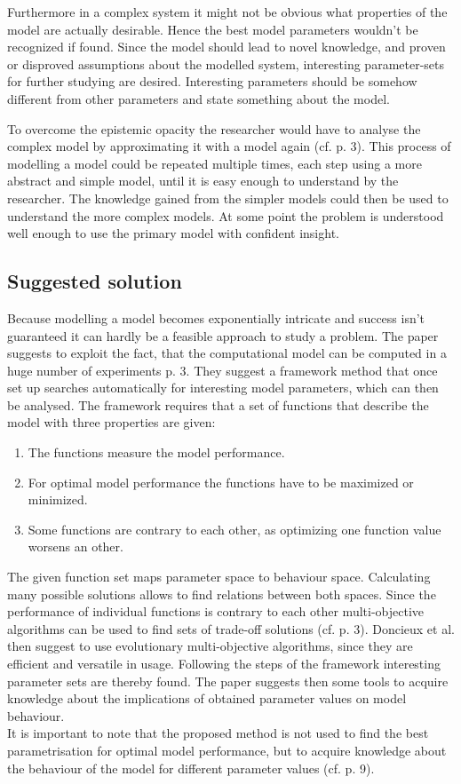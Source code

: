 \documentclass[12pt,twoside]{article}
\theoremstyle{plain}
\theoremstyle{definition}
\theoremstyle{remark}
\begin{document}
Furthermore in a complex system it might not be obvious what properties of the model are actually desirable. Hence the \glqq best\grqq{} model parameters wouldn't be recognized if found.
Since the model should lead to novel knowledge, and proven or disproved assumptions about the modelled system, interesting parameter-sets for further studying are desired. Interesting parameters should be somehow different from other parameters and state something about the model.

To overcome the epistemic opacity the researcher would have to analyse the complex model by approximating it with a model again (cf. \cite{doncieux2015multi} p. 3). This process of modelling a model could be repeated multiple times, each step using a more abstract and simple model, until it is easy enough to understand by the researcher. The knowledge gained from the simpler models could then be used to understand the more complex models. At some point the problem is understood well enough to use the primary model with confident insight.

\subsection{Suggested solution}
Because modelling a model becomes exponentially intricate and success isn't guaranteed it can hardly be a feasible approach to study a problem. The paper suggests to exploit the fact, that the computational model can be computed in a \glqq huge number of experiments\grqq{} \cite{doncieux2015multi} p. 3.
They suggest a framework method that once set up searches automatically for interesting model parameters, which can then be analysed.
The framework requires that a set of functions that describe the model with three properties are given:
\begin{enumerate}
	\item The functions measure the model performance.
	\item For optimal model performance the functions have to be maximized or minimized.
	\item Some functions are contrary to each other, as optimizing one function value worsens an other.
\end{enumerate}
The given function set maps parameter space to behaviour space. Calculating many possible solutions allows to find relations between both spaces.
Since the performance of individual functions is contrary to each other multi-objective algorithms can be used to find sets of trade-off solutions (cf. \cite{doncieux2015multi} p. 3).
Doncieux et al. then suggest to use evolutionary multi-objective algorithms, since they are efficient and versatile in usage. Following the steps of the framework interesting parameter sets are thereby found.
The paper suggests then some tools to acquire knowledge about the implications of obtained parameter values on model behaviour.\\
It is important to note that the proposed method is not used to find the best parametrisation for optimal model performance, but to acquire knowledge about the behaviour of the model for different parameter values (cf. \cite{doncieux2015multi} p. 9).
\end{document}
